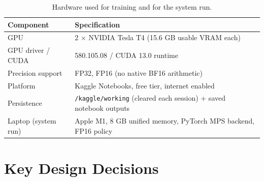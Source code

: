 \begin{table}[!htbp]
\centering
\caption[Hardware configuration]{Hardware used for training and for the system run.}
\label{tab:hardware}
\small
\begin{tabularx}{\textwidth}{@{}L{3.6cm}Y@{}}
\toprule
\textbf{Component} & \textbf{Specification}\\
\midrule
GPU & 2 $\times$ NVIDIA Tesla T4 (15.6 GB usable VRAM each)\\
GPU driver / CUDA & 580.105.08 / CUDA 13.0 runtime\\
Precision support & FP32, FP16 (no native BF16 arithmetic)\\
Platform & Kaggle Notebooks, free tier, internet enabled\\
Persistence & \texttt{/kaggle/working} (cleared each session) + saved notebook outputs\\
\midrule
Laptop (system run) & Apple M1, 8 GB unified memory, PyTorch MPS backend, FP16 policy\\
\bottomrule
\end{tabularx}
\end{table}

\section{Key Design Decisions}
\label{sec:design-choices}


